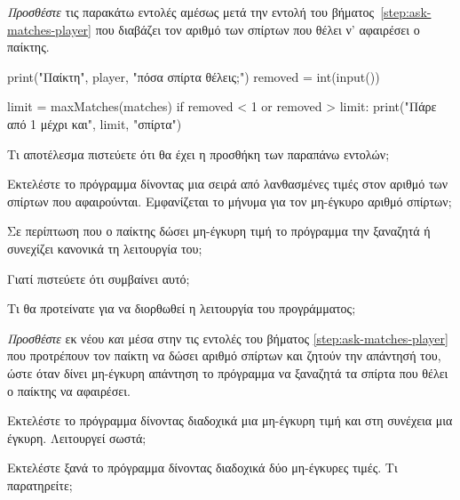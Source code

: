 \documentclass[a4paper,11pt,oneside]{book}
\begin{document}
\begin{step}
\label{step:check-matches}
\emph{Προσθέστε} τις παρακάτω εντολές αμέσως μετά την εντολή του βήματος~\ref{step:ask-matches-player} που διαβάζει τον αριθμό των σπίρτων που θέλει ν' αφαιρέσει ο παίκτης.

\begin{pyplain}
    print("Παίκτη", player, "πόσα σπίρτα θέλεις;")
    removed = int(input())
\end{pyplain}
\begin{pynew}
    limit = maxMatches(matches)
    if removed < 1 or removed > limit:
        print("Πάρε από 1 μέχρι και", limit, "σπίρτα") 
\end{pynew}

Τι αποτέλεσμα πιστεύετε ότι θα έχει η προσθήκη των παραπάνω εντολών; 

\marginnote[14pt]{\icondiscuss}
\dottedline

\dottedline

Εκτελέστε το πρόγραμμα δίνοντας μια σειρά από λανθασμένες τιμές στον αριθμό των σπίρτων που αφαιρούνται. Εμφανίζεται το μήνυμα για τον μη-έγκυρο αριθμό σπίρτων;

\marginnote[14pt]{\icondiscuss}
\dottedline

Σε περίπτωση που ο παίκτης δώσει μη-έγκυρη τιμή το πρόγραμμα την ξαναζητά ή συνεχίζει κανονικά τη λειτουργία του;

\marginnote[14pt]{\icondiscuss}
\dottedline

Γιατί πιστεύετε ότι συμβαίνει αυτό;

\marginnote[14pt]{\icondiscuss}
\dottedline

Τι θα προτείνατε για να διορθωθεί η λειτουργία του προγράμματος;

\marginnote[14pt]{\icondiscuss}
\dottedline

\dottedline
\end{step}

\begin{step}
\label{step:check-matches-2}
\emph{Προσθέστε} εκ νέου \emph{και} μέσα στην  τις εντολές του βήματος \ref{step:ask-matches-player} που προτρέπουν τον παίκτη να δώσει αριθμό σπίρτων και ζητούν την απάντησή του, ώστε όταν δίνει μη-έγκυρη απάντηση το πρόγραμμα να ξαναζητά τα σπίρτα που θέλει ο παίκτης να αφαιρέσει.

Εκτελέστε το πρόγραμμα δίνοντας διαδοχικά μια μη-έγκυρη τιμή και στη συνέχεια μια έγκυρη. Λειτουργεί σωστά;

\marginnote[14pt]{\icondiscuss}
\dottedline

Εκτελέστε ξανά το πρόγραμμα δίνοντας διαδοχικά δύο μη-έγκυρες τιμές. Τι παρατηρείτε; 

\marginnote[14pt]{\icondiscuss}
\dottedline

\dottedline
\end{step}
\end{document}
